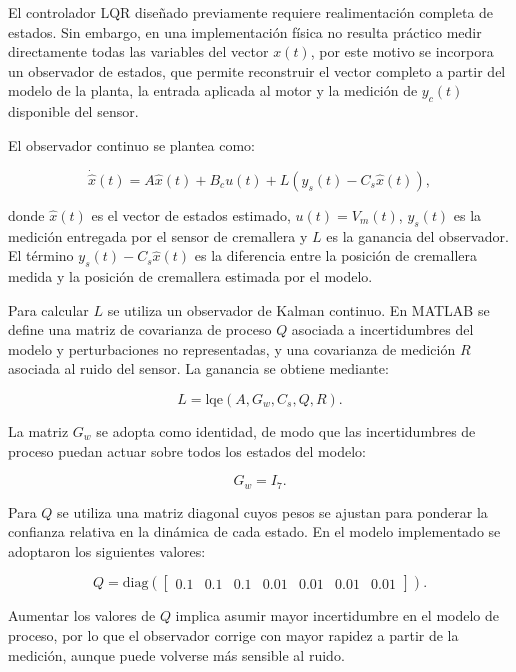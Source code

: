 \documentclass{article}
\begin{document}
El controlador LQR diseñado previamente requiere realimentación completa de estados. Sin embargo, en una implementación física no resulta práctico medir directamente todas las variables del vector $x(t)$, por este motivo se incorpora un observador de estados, que permite reconstruir el vector completo a partir del modelo de la planta, la entrada aplicada al motor y la medición de $y_c(t)$ disponible del sensor.

El observador continuo se plantea como:

\begin{equation}
\dot{\hat{x}}(t)
=
A\hat{x}(t)+B_cu(t)+L\left(y_s(t)-C_s\hat{x}(t)\right),
\end{equation}

donde $\hat{x}(t)$ es el vector de estados estimado, $u(t)=V_m(t)$, $y_s(t)$ es la medición entregada por el sensor de cremallera y $L$ es la ganancia del observador. El término $y_s(t)-C_s\hat{x}(t)$ es la diferencia entre la posición de cremallera medida y la posición de cremallera estimada por el modelo.

Para calcular $L$ se utiliza un observador de Kalman continuo. En MATLAB se define una matriz de covarianza de proceso $Q$ asociada a incertidumbres del modelo y perturbaciones no representadas, y una covarianza de medición $R$ asociada al ruido del sensor. La ganancia se obtiene mediante:

\begin{equation}
L=\mathrm{lqe}(A,G_w,C_s,Q,R).
\end{equation}

La matriz $G_w$ se adopta como identidad, de modo que las incertidumbres de proceso puedan actuar sobre todos los estados del modelo:

\begin{equation}
G_w=I_7.
\end{equation}

Para $Q$ se utiliza una matriz diagonal cuyos pesos se ajustan para ponderar la confianza relativa en la dinámica de cada estado. En el modelo implementado se adoptaron los siguientes valores:

\begin{equation}
Q=\mathrm{diag}\left(
\begin{bmatrix}
0.1 & 0.1 & 0.1 & 0.01 & 0.01 & 0.01 & 0.01
\end{bmatrix}
\right).
\end{equation}

Aumentar los valores de $Q$ implica asumir mayor incertidumbre en el modelo de proceso, por lo que el observador corrige con mayor rapidez a partir de la medición, aunque puede volverse más sensible al ruido.
\end{document}

